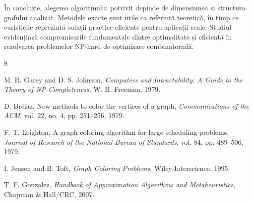 \documentclass[runningheads]{llncs}
\begin{document}
În concluzie, alegerea algoritmului potrivit depinde de dimensiunea și
structura grafului analizat. Metodele exacte sunt utile ca referință teoretică,
în timp ce euristicile reprezintă soluții practice eficiente pentru aplicații
reale. Studiul evidențiază compromisurile fundamentale dintre optimalitate și
eficiență în rezolvarea problemelor NP-hard de optimizare combinatorială.

\begin{thebibliography}{8}

M. R. Garey and D. S. Johnson,
\textit{Computers and Intractability: A Guide to the Theory of NP-Completeness},
W. H. Freeman, 1979.

D. Brélaz,
New methods to color the vertices of a graph,
\textit{Communications of the ACM}, vol. 22, no. 4, pp. 251--256, 1979.

F. T. Leighton,
A graph coloring algorithm for large scheduling problems,
\textit{Journal of Research of the National Bureau of Standards},
vol. 84, pp. 489--506, 1979.

I. Jensen and B. Toft,
\textit{Graph Coloring Problems},
Wiley-Interscience, 1995.

T. F. Gonzalez,
\textit{Handbook of Approximation Algorithms and Metaheuristics},
Chapman \& Hall/CRC, 2007.

\end{thebibliography}
\end{document}
